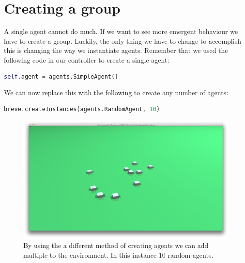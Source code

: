 \section{Creating a group}

A single agent cannot do much. If we want to see more emergent behaviour we have to create a group. Luckily, the only thing we have to change to accomplish this is changing the way we instantiate agents. Remember that we used the following code in our controller to create a single agent:

\begin{lstlisting}[language=Python]
self.agent = agents.SimpleAgent()
\end{lstlisting}

We can now replace this with the following to create any number of agents:

\begin{lstlisting}[language=Python]
breve.createInstances(agents.RandomAgent, 10)
\end{lstlisting}


\begin{figure}[htbp]
\begin{center}
\includegraphics{graphics/randomagents}
\caption{By using the a different method of creating agents we can add multiple to the environment. In this instance 10 random agents.}
\end{center}
\end{figure}

